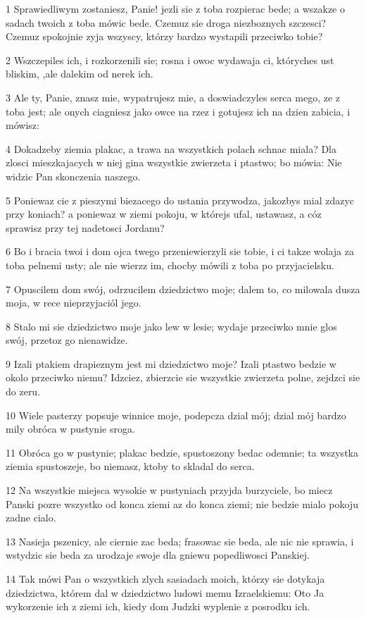 \par 1 Sprawiedliwym zostaniesz, Panie! jezli sie z toba rozpierac bede; a wszakze o sadach twoich z toba mówic bede. Czemuz sie droga niezboznych szczesci? Czemuz spokojnie zyja wszyscy, którzy bardzo wystapili przeciwko tobie?
\par 2 Wszczepiles ich, i rozkorzenili sie; rosna i owoc wydawaja ci, któryches ust bliskim, ,ale dalekim od nerek ich.
\par 3 Ale ty, Panie, znasz mie, wypatrujesz mie, a doswiadczyles serca mego, ze z toba jest; ale onych ciagniesz jako owce na rzez i gotujesz ich na dzien zabicia, i mówisz:
\par 4 Dokadzeby ziemia plakac, a trawa na wszystkich polach schnac miala? Dla zlosci mieszkajacych w niej gina wszystkie zwierzeta i ptastwo; bo mówia: Nie widzic Pan skonczenia naszego.
\par 5 Poniewaz cie z pieszymi biezacego do ustania przywodza, jakozbys mial zdazyc przy koniach? a poniewaz w ziemi pokoju, w którejs ufal, ustawasz, a cóz sprawisz przy tej nadetosci Jordanu?
\par 6 Bo i bracia twoi i dom ojca twego przeniewierzyli sie tobie, i ci takze wolaja za toba pelnemi usty; ale nie wierzz im, chocby mówili z toba po przyjacielsku.
\par 7 Opuscilem dom swój, odrzucilem dziedzictwo moje; dalem to, co milowala dusza moja, w rece nieprzyjaciól jego.
\par 8 Stalo mi sie dziedzictwo moje jako lew w lesie; wydaje przeciwko mnie glos swój, przetoz go nienawidze.
\par 9 Izali ptakiem drapieznym jest mi dziedzictwo moje? Izali ptastwo bedzie w okolo przeciwko niemu? Idzciez, zbierzcie sie wszystkie zwierzeta polne, zejdzci sie do zeru.
\par 10 Wiele pasterzy popsuje winnice moje, podepcza dzial mój; dzial mój bardzo mily obróca w pustynie sroga.
\par 11 Obróca go w pustynie; plakac bedzie, spustoszony bedac odemnie; ta wszystka ziemia spustoszeje, bo niemasz, ktoby to skladal do serca.
\par 12 Na wszystkie miejsca wysokie w pustyniach przyjda burzyciele, bo miecz Panski pozre wszystko od konca ziemi az do konca ziemi; nie bedzie mialo pokoju zadne cialo.
\par 13 Nasieja pszenicy, ale ciernie zac beda; frasowac sie beda, ale nic nie sprawia, i wstydzic sie beda za urodzaje swoje dla gniewu popedliwosci Panskiej.
\par 14 Tak mówi Pan o wszystkich zlych sasiadach moich, którzy sie dotykaja dziedzictwa, którem dal w dziedzictwo ludowi memu Izraelskiemu: Oto Ja wykorzenie ich z ziemi ich, kiedy dom Judzki wyplenie z posrodku ich.
